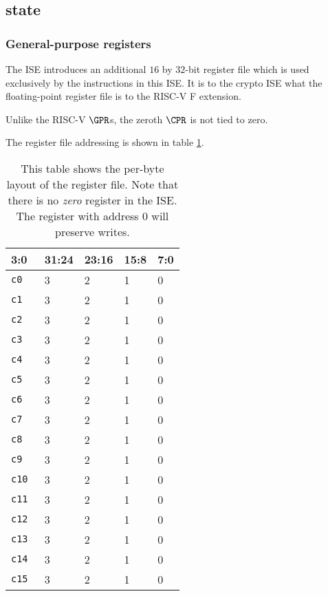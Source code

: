 \subsection{\ISE state}
\label{sec:spec:state}


\subsubsection{General-purpose registers}
\label{sec:spec:state:gpr}

The ISE introduces an additional $16$ by $32$-bit register file which
is used exclusively by the instructions in this ISE.
It is to the crypto ISE what the floating-point register file is to the
RISC-V F extension.

Unlike the RISC-V $\GPR$s, the zeroth $\CPR$ is not tied to zero.

The register file addressing is shown in table \ref{tab:state-addr}.

\begin{table}[h!]
\centering
\begin{tabular}{|l|l l l l|}
\hline
\multicolumn{1}{|l|}{3:0} & \textbf{31:24} & \textbf{23:16} & \textbf{15:8} & \textbf{7:0} \\ \hline
{\tt c0  } & 3 & 2 & 1 & 0      \\ \hline
{\tt c1  } & 3 & 2 & 1 & 0      \\ \hline
{\tt c2  } & 3 & 2 & 1 & 0      \\ \hline
{\tt c3  } & 3 & 2 & 1 & 0      \\ \hline
{\tt c4  } & 3 & 2 & 1 & 0      \\ \hline
{\tt c5  } & 3 & 2 & 1 & 0      \\ \hline
{\tt c6  } & 3 & 2 & 1 & 0      \\ \hline
{\tt c7  } & 3 & 2 & 1 & 0      \\ \hline
{\tt c8  } & 3 & 2 & 1 & 0      \\ \hline
{\tt c9  } & 3 & 2 & 1 & 0      \\ \hline
{\tt c10 } & 3 & 2 & 1 & 0      \\ \hline
{\tt c11 } & 3 & 2 & 1 & 0      \\ \hline
{\tt c12 } & 3 & 2 & 1 & 0      \\ \hline
{\tt c13 } & 3 & 2 & 1 & 0      \\ \hline
{\tt c14 } & 3 & 2 & 1 & 0      \\ \hline
{\tt c15 } & 3 & 2 & 1 & 0      \\ \hline
\end{tabular}
\caption{This table shows the per-byte layout of the register file.
Note that there is no {\em zero} register in the ISE.
The register with address $0$ will preserve writes.}
\label{tab:state-addr}
\end{table}

